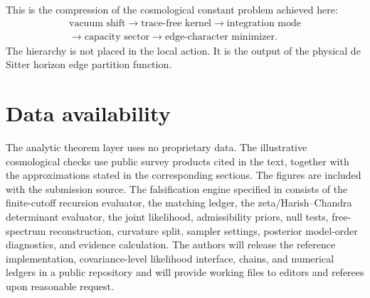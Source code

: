 \documentclass[aps,prd,reprint,nofootinbib,superscriptaddress,floatfix]{revtex4-2}
\numberwithin{equation}{section}
\theoremstyle{definition}
\theoremstyle{plain}
\begin{document}
This is the compression of the cosmological constant problem achieved here:
\[
\boxed{
\begin{gathered}
\text{vacuum shift}
\to
\text{trace-free kernel}
\to
\text{integration mode}
\\
\to
\text{capacity sector}
\to
\text{edge-character minimizer}.
\end{gathered}
}
\]
The hierarchy is not placed in the local action.  It is the output of the
physical de Sitter horizon edge partition function.



\section*{Data availability}

The analytic theorem layer uses no proprietary data.  The illustrative
cosmological checks use public survey products cited in the text, together
with the approximations stated in the corresponding sections.  The figures are
included with the submission source.  The falsification engine specified in
 consists of the finite-cutoff recursion
evaluator, the matching ledger, the zeta/Harish--Chandra determinant
evaluator, the joint likelihood, admissibility priors, null tests,
free-spectrum reconstruction, curvature split, sampler settings, posterior
model-order diagnostics, and evidence calculation.  The authors will release
the reference implementation, covariance-level likelihood interface, chains,
and numerical ledgers in a public repository and will provide working files to
editors and referees upon reasonable request.
\end{document}
